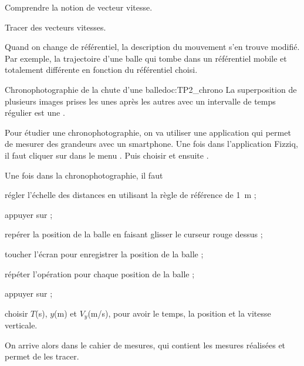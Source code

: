 \teteSndMouv

\nomPrenomClasse
{}

\vspace*{-12pt}
\begin{objectifs}
  \item Comprendre la notion de vecteur vitesse.
  \item Tracer des vecteurs vitesses.
\end{objectifs}

\begin{contexte}
  Quand on change de référentiel, la description du mouvement s'en trouve modifié.
  Par exemple, la trajectoire d'une balle qui tombe dans un référentiel mobile et totalement différente en fonction du référentiel choisi.

\end{contexte}




\begin{doc}{Chronophotographie de la chute d'une balle}{doc:TP2_chrono}  
  La superposition de plusieurs images prises les unes après les autres avec un intervalle de temps régulier est une .

  Pour étudier une chronophotographie, on va utiliser  une application qui permet de mesurer des grandeurs avec un smartphone.
  Une fois dans l'application Fizziq, il faut cliquer sur  dans le menu . Puis choisir  et ensuite . 

  Une fois dans la chronophotographie, il faut 
  \begin{protocole}
    \item régler l'échelle des distances en utilisant la règle de référence de \qty{1}{\m} ;
    \item appuyer sur  ;
    \item repérer la position de la balle en faisant glisser le curseur rouge dessus ;
    \item toucher l'écran pour enregistrer la position de la balle ;
    \item répéter l'opération pour chaque position de la balle ;
    \item appuyer sur  ;
    \item choisir $T$(s), $y$(m) et $V_y$(m/s), pour avoir le temps, la position et la vitesse verticale.
  \end{protocole}
  On arrive alors dans le cahier de mesures, qui contient les mesures réalisées et permet de les tracer.
\end{doc}

